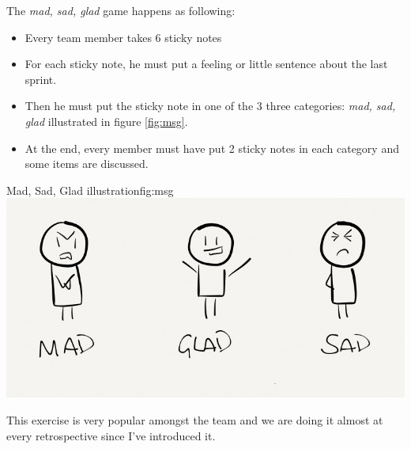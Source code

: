 The \emph{mad, sad, glad} game happens as following:
\begin{itemize}
    \item Every team member takes 6 sticky notes
    \item For each sticky note, he must put a feeling or little sentence about
        the last sprint.
    \item Then he must put the sticky note in one of the 3 three categories: \emph{mad, sad, glad} illustrated in
        figure \ref{fig:msg}.
    \item At the end, every member must have put 2 sticky notes in each category and some items are discussed.
\end{itemize}

\begin{figureGraphics}{Mad, Sad, Glad illustration}{fig:msg}
    \includegraphics[height=0.2\textheight]{./src/img/mgs.png}
\end{figureGraphics}
This exercise is very popular amongst the team and we are doing it almost at every retrospective since I've introduced it.

